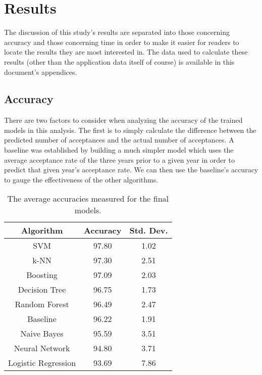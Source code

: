 \chapter{Results}
The discussion of this study's results are separated into those concerning accuracy and those concerning time in order to make it easier for readers to locate the results they are most interested in. The data used to calculate these results (other than the application data itself of course) is available in this document's appendices.



\section{Accuracy}
There are two factors to consider when analyzing the accuracy of the trained models in this analysis. The first is to simply calculate the difference between the predicted number of acceptances and the actual number of acceptances. A baseline was established by building a much simpler model which uses the average acceptance rate of the three years prior to a given year in order to predict that given year's acceptance rate. We can then use the baseline's accuracy to gauge the effectiveness of the other algorithms.\\

\begin{table}[!hb]
\begin{center}
\begin{tabular}{c|c|c}
	\textbf{Algorithm}		&\textbf{Accuracy}	&\textbf{Std. Dev.}\\\hline
	SVM						&97.80				&1.02\\
	k-NN					&97.30				&2.51\\
	Boosting				&97.09				&2.03\\
	Decision Tree			&96.75				&1.73\\
	Random Forest			&96.49				&2.47\\
	Baseline				&96.22				&1.91\\
	Naive Bayes				&95.59				&3.51\\
	Neural Network			&94.80				&3.71\\
	Logistic Regression		&93.69				&7.86
\end{tabular}
\end{center}
\caption{The average accuracies measured for the final models.}
\label{tab:accuracies}
\end{table}

